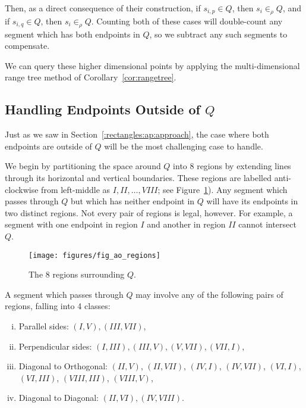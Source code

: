 Then, as a direct consequence of their construction, if $s_{i,p} \in Q$, then $s_i \in_\rho Q$, and if $s_{i,q} \in Q$, then $s_i \in_\rho Q$.  Counting both of these cases will double-count any segment which has both endpoints in $Q$, so we subtract any such segments to compensate.

We can query these higher dimensional points by applying the multi-dimensional range tree method of Corollary~\ref{cor:rangetree}.


\subsection{Handling Endpoints Outside of $Q$}
\label{:rectangles:ao:bothout}

Just as we saw in Section~\ref{:rectangles:ap:approach}, the case where both endpoints are outside of $Q$ will be the most challenging case to handle.

We begin by partitioning the space around $Q$ into 8 regions by extending lines through its horizontal and vertical boundaries. These regions are labelled anti-clockwise from left-middle as $I, II, \ldots, VIII$; see Figure~\ref{fig:rectangles:ao:regions}). Any segment which passes through $Q$ but which has neither endpoint in $Q$ will have its endpoints in two distinct regions. Not every pair of regions is legal, however. For example, a segment with one endpoint in region $I$ and another in region $II$ cannot intersect $Q$.

\begin{figure}[t]
\begin{center}
  \texttt{[image: figures/fig\_ao\_regions]}
  \caption{The 8 regions surrounding $Q$.}
  \label{fig:rectangles:ao:regions}
\end{center}
\end{figure}

A segment which passes through $Q$ may involve any of the following pairs of regions, falling into 4 classes:

\begin{enumerate}[i.]
\item Parallel sides: $(I, V), (III, VII)$,
\item Perpendicular sides: $(I, III), (III, V), (V,VII), (VII, I)$,
\item Diagonal to Orthogonal: $(II, V)$, $(II, VII)$, $(IV, I)$, $(IV,VII)$, $(VI, I)$, $(VI, III)$, $(VIII, III)$, $(VIII, V)$,
\item Diagonal to Diagonal: $(II, VI), (IV, VIII)$.
\end{enumerate}

